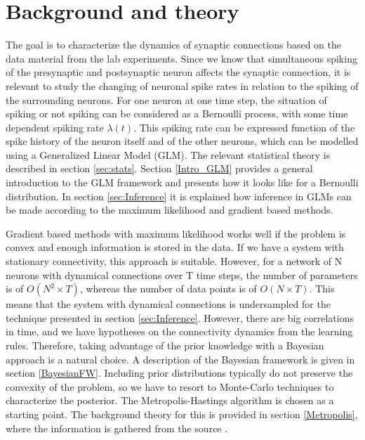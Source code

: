 
\chapter{Background and theory}
\label{ch:theory}

The goal is to characterize the dynamics of synaptic connections based on the data material from the lab experiments. Since we know that simultaneous spiking of the presynaptic and postsynaptic neuron affects the synaptic connection, it is relevant to study the changing of neuronal spike rates in relation to the spiking of the surrounding neurons. For one neuron at one time step, the situation of spiking or not spiking can be considered as a Bernoulli process, with some time dependent spiking rate $\lambda (t)$. This spiking rate can be expressed function of the spike history of the neuron itself and of the other neurons, which can be modelled using a Generalized Linear Model (GLM). The relevant statistical theory is described in section \ref{sec:stats}. Section \ref{Intro_GLM} provides a general introduction to the GLM framework and presents how it looks like for a Bernoulli distribution. In section \ref{sec:Inference} it is explained how inference in GLMs can be made according to the maximum likelihood and gradient based methods. 

Gradient based methods with maximum likelihood works well if the problem is convex and enough information is stored in the data. If we have a system with stationary connectivity, this approach is suitable. However, for a network of N neurons with dynamical connections over T time steps, the number of parameters is of $O(N^2 \times T)$, whereas the number of data points is of $O(N \times T)$. This means that the system with dynamical connections is undersampled for the technique presented in section \ref{sec:Inference}. However, there are big correlations in time, and we have hypotheses on the connectivity dynamics from the learning rules. Therefore, taking advantage of the prior knowledge with a Bayesian approach is a natural choice. A description of the Bayesian framework is given in section \ref{BayesianFW}. Including prior distributions typically do not preserve the convexity of the problem, so we have to resort to Monte-Carlo techniques to characterize the posterior. The Metropolis-Hastings algorithm is chosen as a starting point. The background theory for this is provided in section \ref{Metropolis}, where the information is gathered from the source \cite{MC}.

